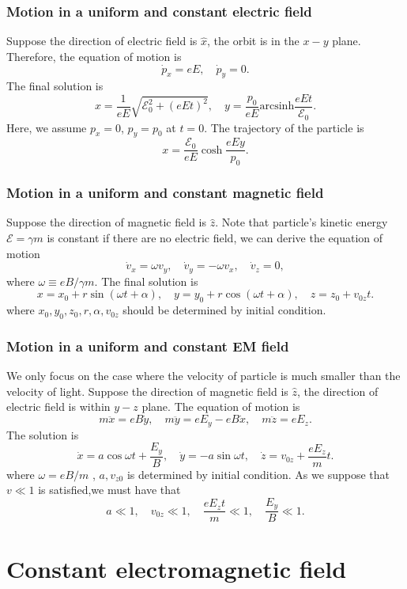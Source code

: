 \subsubsection{Motion in a uniform and constant electric field}
Suppose the direction of electric field is  $\hat{x}$, the orbit is in the $x-y$ plane. Therefore, the equation of motion is
\[\dot{p}_x = eE , \quad \dot{p}_y = 0.\]
The final solution is
\[x = \frac{1}{eE}\sqrt{\mathcal{E}_0^2 + (eEt)^2} , \quad y = \frac{p_0}{eE} \mathrm{arcsinh} \frac{eEt}{\mathcal{E}_0}.\]
Here, we assume $p_x = 0$, $p_y=p_0$ at $t = 0$.
The trajectory of the particle is
\[x = \frac{\mathcal{E}_0}{eE}\cosh \frac{eEy}{p_0}.\]

\subsubsection{Motion in a uniform and constant magnetic field}
Suppose the direction of magnetic field is $\hat{z}$. Note that particle's kinetic energy $\mathcal{E} = \gamma m$ is constant if there are no electric field, we can derive the equation of motion
\[\dot{v}_x = \omega v_y , \quad \dot{v}_y = -\omega v_x , \quad \dot{v}_z = 0,\]
where $\omega \equiv {eB}/{\gamma m}$. The final solution is
\[x = x_0 + r\sin(\omega t + \alpha) , \quad y = y_0 + r\cos(\omega t + \alpha) , \quad z = z_0 + v_{0z}t.\]
where $x_0,y_0,z_0,r,\alpha,v_{0z}$ should be determined by initial condition.

\subsubsection{Motion in a uniform and constant EM field}
We only focus on the case where the velocity of particle is much smaller than the velocity of light. 
Suppose the direction of magnetic field is $\hat{z}$, the direction of electric field is within $y-z$ plane. The equation of motion is
\[m\ddot{x} = eB\dot{y} , \quad m\ddot{y} =eE_y - eB\dot{x} , \quad m\ddot{z}=eE_z.\]
The solution is
\[\dot{x} = a \cos \omega t + \frac{E_y}{B} , \quad \dot{y} = -a\sin \omega t , \quad \dot{z} = v_{0z} + \frac{eE_z}{m}t.\]
where $\omega = {eB}/{m}$ , $a,v_{z0}$ is determined by initial condition. As we suppose that $v \ll 1$ is satisfied,we must have that
\[a \ll 1 , \quad v_{0z} \ll 1 , \quad \frac{eE_z t}{m} \ll 1 , \quad \frac{E_y}{B} \ll 1.\]

\section{Constant electromagnetic field}
